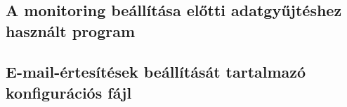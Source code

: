 \appendix
\chapter*{\fuggelek}
\setcounter{chapter}{\appendixnumber}
\label{cha:appendix}
\linespread{1}

\section{A monitoring beállítása előtti adatgyűjtéshez használt program}



\clearpage\section{E-mail-értesítések beállítását tartalmazó konfigurációs fájl}

